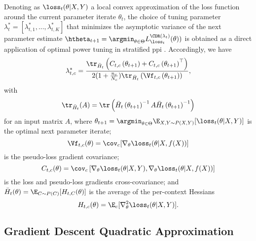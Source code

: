 \documentclass[journal]{IEEEtran}
\begin{document}
Denoting as $\loss_t(\theta | X, Y)$ a local convex approximation of the loss function around the current parameter iterate $\theta_t$, the choice of tuning parameter $\lambda^{*}_t = [\lambda^{*}_{t, 1}, ..., \lambda^{*}_{t, K}]$ that minimizes the asymptotic variance of the next parameter estimate $\htheta_{t+1} = \argmin_{\theta \in \Theta} L^{\CDR(\lambda_t)}_{\loss_t}(\theta))$ is obtained as a direct application of optimal power tuning in stratified \gls{ppi} \cite[Prop.~2]{fisch2024stratified}.
Accordingly, we have
\begin{equation}
\label{eq:optimal_tuning_general}
\begin{split}
\lambda^{*}_{t, c} = \frac{
        \tr_{\bar{H}_t}\left(
            C_{t, c}\left( \theta_{t+1} \right) +
            C_{t, c}\left( \theta_{t+1} \right)^\top
        \right)
    }{
        2 (1 + \frac{n_c}{N_c}) \tr_{\bar{H}_t}\left(
            \Vf_{t, c}\left( \theta_{t+1} \right)
        \right)
    },
\end{split}    
\end{equation}
with 
\begin{equation}
\tr_{\bar{H}_t}(A) = \tr\left( 
    \bar{H}_t\left( \theta_{t+1} \right)^{-1}
    A
    \bar{H}_t\left( \theta_{t+1} \right)^{-1}
\right)
\end{equation}
for an input matrix $A$, where $\theta_{t+1} = \argmin_{\theta \in \Theta} \E_{X, Y \sim P(X,Y)}[\loss_t(\theta | X, Y)]$ is the optimal next parameter iterate; 
\begin{equation}
    \Vf_{t, c}(\theta) = \cov_c[ \nabla_\theta \loss_t(\theta | X, f(X)) ]
\end{equation}
is the pseudo-loss gradient covariance; 
\begin{equation}
    C_{t, c}(\theta) = \cov_c\left[ \nabla_\theta \loss_t(\theta | X, Y), \nabla_\theta \loss_t(\theta | X, f(X)) \right]
\end{equation}
is the loss and pseudo-loss gradients cross-covariance; and $\bar{H}_t(\theta) = \E_{C \sim P(C)}[H_{t, C}(\theta)]$ is the average of the per-context Hessians 
\begin{equation}
    H_{t, c}(\theta) = \E_c[\nabla^{2}_{\theta} \loss_t(\theta | X, Y)].
\end{equation}

\subsection{Gradient Descent Quadratic Approximation}
\end{document}
